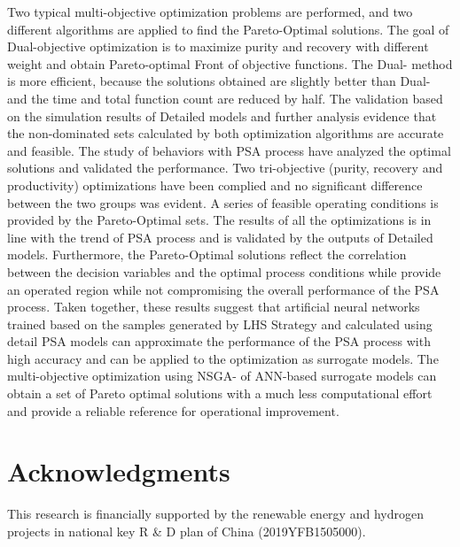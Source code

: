 \documentclass[preprint,12pt]{elsarticle}
\begin{document}
Two typical multi-objective optimization problems are performed, and two different algorithms are applied to find the Pareto-Optimal solutions. The goal of Dual-objective optimization is to maximize purity and recovery with different weight and obtain Pareto-optimal Front of objective functions. The Dual-\uppercase\expandafter{} method is more efficient, because the solutions obtained are slightly better than Dual-\uppercase\expandafter{} and the time and total function count are reduced by half. The validation based on the simulation results of Detailed models and further analysis evidence that the non-dominated sets calculated by both optimization algorithms are accurate and feasible. The study of behaviors with PSA process have analyzed the optimal solutions and validated the performance. Two tri-objective (purity, recovery and productivity) optimizations have been complied and no significant difference between the two groups was evident. A series of feasible operating conditions is provided by the Pareto-Optimal sets. The results of all the optimizations is in line with the trend of PSA process and is validated by the outputs of Detailed models. Furthermore, the Pareto-Optimal solutions reflect the correlation between the decision variables and the optimal process conditions while provide an operated region while not compromising the overall performance of the PSA process. 
Taken together, these results suggest that artificial neural networks trained based on the samples generated by LHS Strategy and calculated using detail PSA models can approximate the performance of the PSA process with high accuracy and can be applied to the optimization as surrogate models. The multi-objective optimization using NSGA-\uppercase\expandafter{} of ANN-based surrogate models can obtain a set of Pareto optimal solutions with a much less computational effort and provide a reliable reference for operational improvement.
\section{Acknowledgments}
This research is financially supported by the renewable energy and hydrogen projects in national key R \& D plan of China (2019YFB1505000).


	
\end{document}
